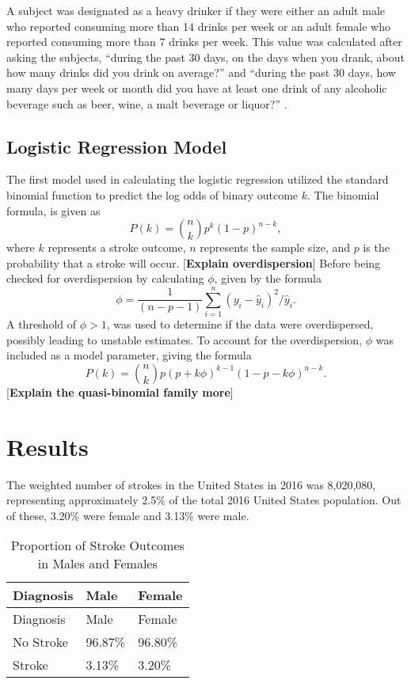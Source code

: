 \documentclass[11pt,]{article}
\begin{document}
A subject was designated as a heavy drinker if they were either an adult
male who reported consuming more than 14 drinks per week or an adult
female who reported consuming more than 7 drinks per week. This value
was calculated after asking the subjects, ``during the past 30 days, on
the days when you drank, about how many drinks did you drink on
average?'' and ``during the past 30 days, how many days per week or
month did you have at least one drink of any alcoholic beverage such as
beer, wine, a malt beverage or liquor?''
\citep{CentersforDiseaseControlandPrevention2007}.

\subsection{Logistic Regression Model}\label{logistic-regression-model}

The first model used in calculating the logistic regression utilized the
standard binomial function to predict the log odds of binary outcome
\(k\). The binomial formula, is given as
\[P(k)={n \choose k}p^{k}(1-p)^{n-k},\] where \(k\) represents a stroke
outcome, \(n\) represents the sample size, and \(p\) is the probability
that a stroke will occur. {[}\textbf{Explain overdispersion}{]} Before
being checked for overdispersion by calculating \(\phi\), given by the
formula
\[\phi = \frac{1}{(n-p-1)}\sum_{i=1}^{n} (y_{i} -\hat{y} _{i})^{2} 
/ \hat{y} _{i}.\] A threshold of \(\phi > 1\), was used to determine if
the data were overdispersed, possibly leading to unstable estimates. To
account for the overdispersion, \(\phi\) was included as a model
parameter, giving the formula
\[P(k)={n \choose k}p(p+k\phi)^{k-1}(1-p-k\phi)^{n-k}.\]
{[}\textbf{Explain the quasi-binomial family more}{]}

\section{Results}\label{results}

The weighted number of strokes in the United States in 2016 was
8,020,080, representing approximately 2.5\% of the total 2016 United
States population. Out of these, 3.20\% were female and 3.13\% were
male.

\begin{longtable}[]{@{}lll@{}}
\caption{Proportion of Stroke Outcomes in Males and
Females}\tabularnewline
\toprule
Diagnosis & Male & Female\tabularnewline
\midrule
\endfirsthead
\toprule
Diagnosis & Male & Female\tabularnewline
\midrule
\endhead
No Stroke & 96.87\% & 96.80\%\tabularnewline
Stroke & 3.13\% & 3.20\%\tabularnewline
\bottomrule
\end{longtable}
\end{document}
